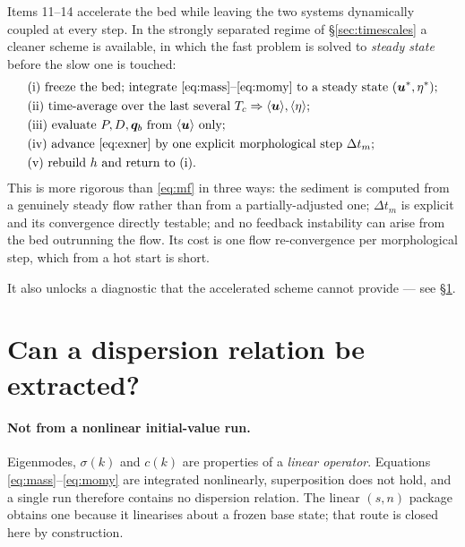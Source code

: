 \documentclass[11pt,a4paper]{article}
\begin{document}
Items 11--14 accelerate the bed while leaving the two systems dynamically coupled at every
step. In the strongly separated regime of \S\ref{sec:timescales} a cleaner scheme is
available, in which the fast problem is solved to \emph{steady state} before the slow one
is touched:
\begin{align}
  &\text{(i) freeze the bed; integrate \eqref{eq:mass}--\eqref{eq:momy}
        to a steady state } (\bm u^\ast,\eta^\ast);\notag\\
  &\text{(ii) time-average over the last several }T_c
        \Rightarrow \langle\bm u\rangle,\langle\eta\rangle;\notag\\
  &\text{(iii) evaluate } P,D,\bm q_b \text{ from } \langle\bm u\rangle
        \text{ only};\notag\\
  &\text{(iv) advance \eqref{eq:exner} by one explicit morphological step }
        \Delta t_m;\notag\\
  &\text{(v) rebuild } h \text{ and return to (i).}\notag
\end{align}
This is more rigorous than \eqref{eq:mf} in three ways: the sediment is computed from a
genuinely steady flow rather than from a partially-adjusted one; $\Delta t_m$ is explicit
and its convergence directly testable; and no feedback instability can arise from the bed
outrunning the flow. Its cost is one flow re-convergence per morphological step, which
from a hot start is short.

It also unlocks a diagnostic that the accelerated scheme cannot provide --- see
\S\ref{sec:dispersion}.

\section{Can a dispersion relation be extracted?}
\label{sec:dispersion}

\paragraph{Not from a nonlinear initial-value run.} Eigenmodes, $\sigma(k)$ and $c(k)$ are
properties of a \emph{linear operator}. Equations \eqref{eq:mass}--\eqref{eq:momy} are
integrated nonlinearly, superposition does not hold, and a single run therefore contains no
dispersion relation. The linear $(s,n)$ package obtains one because it linearises about a
frozen base state; that route is closed here by construction.
\end{document}
